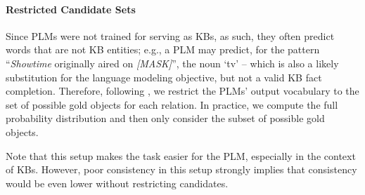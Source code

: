 










\paragraph{Restricted Candidate Sets}

Since PLMs were not trained for
serving as KBs, as such, they often predict words
that are not KB entities;
e.g., a PLM may predict, for the pattern ``\textit{Showtime} originally aired on \textit{[MASK]}'', the noun
`tv' --  which is also a likely substitution for the language
modeling objective, but not a valid KB fact completion.
Therefore,
following \citep{Xiong2020Pretrained, kassner2021multilingual},
we
restrict the PLMs' output vocabulary to the set of possible gold objects for each
relation. In practice, we compute the full probability
distribution and then only consider the subset of possible
gold objects.

Note that this setup makes the task easier for the PLM,
especially in the context of KBs. However, poor
consistency in this setup strongly implies that consistency
would be even lower without restricting candidates.